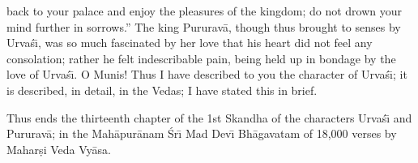 back to your palace and enjoy the pleasures of the kingdom; do not drown your mind further in sorrows.'' The king Pururav\=a, though thus brought to senses by Urva\'s\={\i}, was so much fascinated by her love that his heart did not feel any consolation; rather he felt indescribable pain, being held up in bondage by the love of Urva\'s\={\i}. O Munis! Thus I have described to you the character of Urva\'s\={\i}; it is described, in detail, in the Vedas; I have stated this in brief.

Thus ends the thirteenth chapter of the 1st Skandha of the characters Urva\'s\={\i} and Pururav\=a; in the Mah\=apur\=anam \'Sr\={\i} Mad Dev\={\i} Bh\=agavatam of 18,000 verses by Mahar\d{s}i Veda Vy\=asa.



